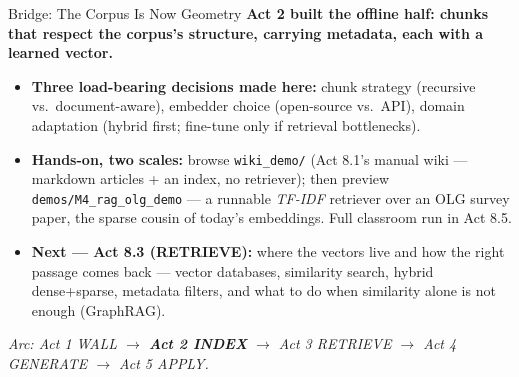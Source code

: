 \begin{frame}{Bridge: The Corpus Is Now Geometry}
\textbf{Act 2 built the offline half: chunks that respect the corpus's structure, carrying metadata, each with a learned vector.}

\medskip
\begin{itemize}
\item \textbf{Three load-bearing decisions made here:} chunk strategy (recursive vs.\ document-aware), embedder choice (open-source vs.\ API), domain adaptation (hybrid first; fine-tune only if retrieval bottlenecks).

\medskip
\item \textbf{Hands-on, two scales:} browse \texttt{wiki\_demo/} (Act 8.1's manual wiki --- markdown articles + an index, no retriever); then preview \texttt{demos/M4\_rag\_olg\_demo} --- a runnable \emph{TF-IDF} retriever over an OLG survey paper, the sparse cousin of today's embeddings. Full classroom run in Act 8.5.

\medskip
\item \textbf{Next --- Act 8.3 (RETRIEVE):} where the vectors live and how the right passage comes back --- vector databases, similarity search, hybrid dense+sparse, metadata filters, and what to do when similarity alone is not enough (GraphRAG).
\end{itemize}

\bigskip
\centering
\footnotesize\textit{Arc: Act 1 WALL $\to$ \textbf{Act 2 INDEX} $\to$ Act 3 RETRIEVE $\to$ Act 4 GENERATE $\to$ Act 5 APPLY.}
\end{frame}


